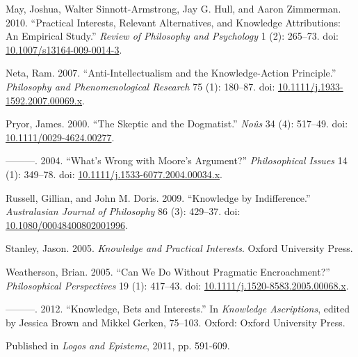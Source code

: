 \documentclass[
  11pt,
  letterpaper,
  DIV=11,
  numbers=noendperiod,
  twoside]{scrartcl}
\newlength{\cslhangindent}
\newenvironment{CSLReferences}[2] %
 {\begin{list}{}{%
  \setlength{\itemindent}{0pt}
  \setlength{\leftmargin}{0pt}
  \setlength{\parsep}{0pt}
  \ifodd #1
   \setlength{\leftmargin}{\cslhangindent}
   \setlength{\itemindent}{-1\cslhangindent}
  \fi
  \setlength{\itemsep}{#2\baselineskip}}}
 {\end{list}}
\begin{document}
\begin{CSLReferences}{1}{0}
May, Joshua, Walter Sinnott-Armstrong, Jay G. Hull, and Aaron Zimmerman.
2010. {``Practical Interests, Relevant Alternatives, and Knowledge
Attributions: An Empirical Study.''} \emph{Review of Philosophy and
Psychology} 1 (2): 265--73. doi:
\href{https://doi.org/10.1007/s13164-009-0014-3}{10.1007/s13164-009-0014-3}.

Neta, Ram. 2007. {``Anti-Intellectualism and the Knowledge-Action
Principle.''} \emph{Philosophy and Phenomenological Research} 75 (1):
180--87. doi:
\href{https://doi.org/10.1111/j.1933-1592.2007.00069.x}{10.1111/j.1933-1592.2007.00069.x}.

Pryor, James. 2000. {``{The Skeptic and the Dogmatist}.''} \emph{No{û}s}
34 (4): 517--49. doi:
\href{https://doi.org/10.1111/0029-4624.00277}{10.1111/0029-4624.00277}.

---------. 2004. {``{What's Wrong with Moore's Argument?}''}
\emph{Philosophical Issues} 14 (1): 349--78. doi:
\href{https://doi.org/10.1111/j.1533-6077.2004.00034.x}{10.1111/j.1533-6077.2004.00034.x}.

Russell, Gillian, and John M. Doris. 2009. {``Knowledge by
Indifference.''} \emph{Australasian Journal of Philosophy} 86 (3):
429--37. doi:
\href{https://doi.org/10.1080/00048400802001996}{10.1080/00048400802001996}.

Stanley, Jason. 2005. \emph{{Knowledge and Practical Interests}}. Oxford
University Press.

Weatherson, Brian. 2005. {``{Can We Do Without Pragmatic
Encroachment?}''} \emph{Philosophical Perspectives} 19 (1): 417--43.
doi:
\href{https://doi.org/10.1111/j.1520-8583.2005.00068.x}{10.1111/j.1520-8583.2005.00068.x}.

---------. 2012. {``Knowledge, Bets and Interests.''} In \emph{Knowledge
Ascriptions}, edited by Jessica Brown and Mikkel Gerken, 75--103.
Oxford: Oxford University Press.

\end{CSLReferences}



\noindent Published in\emph{
Logos and Episteme}, 2011, pp. 591-609.
\end{document}
